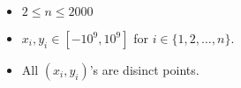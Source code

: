 \begin{itemize}
\tightlist
\item $2\le n\le 2000$
\item $x_i,y_i\in [-10^9, 10^9]$ for $i\in \{1,2,\ldots,n\}$.
\item All $(x_i,y_i)$'s are disinct points.
\end{itemize}
